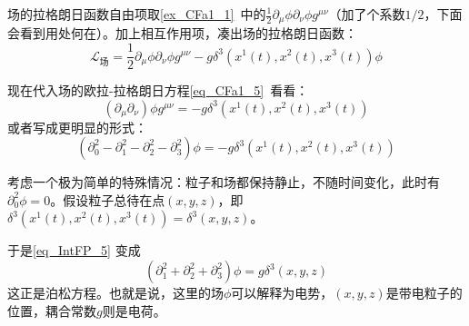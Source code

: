 场的拉格朗日函数自由项取\autoref{ex_CFa1_1}~中的$\frac{1}{2}\partial_\mu\phi\partial_\nu\phi g^{\mu\nu}$（加了个系数$1/2$，下面会看到用处何在）。加上相互作用项，凑出场的拉格朗日函数：
\begin{equation}
\mathcal{L}_{\text{场}} = \frac{1}{2}\partial_\mu\phi\partial_\nu\phi g^{\mu\nu} - g\delta^3(x^1(t), x^2(t), x^3(t))\phi
\end{equation}

现在代入场的欧拉-拉格朗日方程\autoref{eq_CFa1_5}~看看：
\begin{equation}
(\partial_\mu\partial_\nu)\phi g^{\mu\nu} = -g\delta^3(x^1(t), x^2(t), x^3(t))
\end{equation}
或者写成更明显的形式：
\begin{equation}\label{eq_IntFP_5}
(\partial_0^2-\partial_1^2-\partial_2^2-\partial_3^2)\phi = -g\delta^3(x^1(t), x^2(t), x^3(t))
\end{equation}

考虑一个极为简单的特殊情况：粒子和场都保持静止，不随时间变化，此时有$\partial_0^2\phi = 0$。假设粒子总待在点$(x, y, z)$，即$\delta^3(x^1(t), x^2(t), x^3(t))=\delta^3(x, y, z)$。

于是\autoref{eq_IntFP_5} 变成
\begin{equation}
(\partial_1^2+\partial_2^2+\partial_3^2)\phi = g\delta^3(x, y, z)
\end{equation}
这正是泊松方程。也就是说，这里的场$\phi$可以解释为电势，$(x, y, z)$是带电粒子的位置，耦合常数$g$则是电荷。















